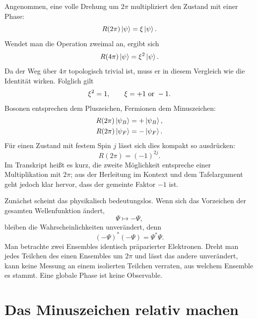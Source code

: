 Angenommen, eine volle Drehung um \(2\pi\) multipliziert den Zustand mit einer Phase:
\begin{equation}
R(2\pi)\left\lvert\psi\right\rangle=\xi\left\lvert\psi\right\rangle.
\end{equation}
Wendet man die Operation zweimal an, ergibt sich
\begin{equation}
R(4\pi)\left\lvert\psi\right\rangle=\xi^2\left\lvert\psi\right\rangle.
\end{equation}
Da der Weg über \(4\pi\) topologisch trivial ist, muss er in diesem Vergleich wie die Identität wirken. Folglich gilt
\begin{equation}
\xi^2=1,
\qquad
\xi=+1\ \hbox{or}\ -1.
\end{equation}
Bosonen entsprechen dem Pluszeichen, Fermionen dem Minuszeichen:
\begin{align}
R(2\pi)\left\lvert\psi_B\right\rangle&=+\left\lvert\psi_B\right\rangle,\\
R(2\pi)\left\lvert\psi_F\right\rangle&=-\left\lvert\psi_F\right\rangle.
\end{align}
Für einen Zustand mit festem Spin \(j\) lässt sich dies kompakt so ausdrücken:
\begin{equation}
R(2\pi)=(-1)^{2j}.
\end{equation}
Im Transkript heißt es kurz, die zweite Möglichkeit entspreche einer Multiplikation mit \(2\pi\); aus der Herleitung im Kontext und dem Tafelargument geht jedoch klar hervor, dass der gemeinte Faktor \(-1\) ist.

Zunächst scheint das physikalisch bedeutungslos. Wenn sich das Vorzeichen der gesamten Wellenfunktion ändert,
\begin{equation}
\Psi\longmapsto-\Psi,
\end{equation}
bleiben die Wahrscheinlichkeiten unverändert, denn
\begin{equation}
(-\Psi)^*(-\Psi)=\Psi^*\Psi.
\end{equation}
Man betrachte zwei Ensembles identisch präparierter Elektronen. Dreht man jedes Teilchen des einen Ensembles um \(2\pi\) und lässt das andere unverändert, kann keine Messung an einem isolierten Teilchen verraten, aus welchem Ensemble es stammt. Eine globale Phase ist keine Observable.

\section{Das Minuszeichen relativ machen}

